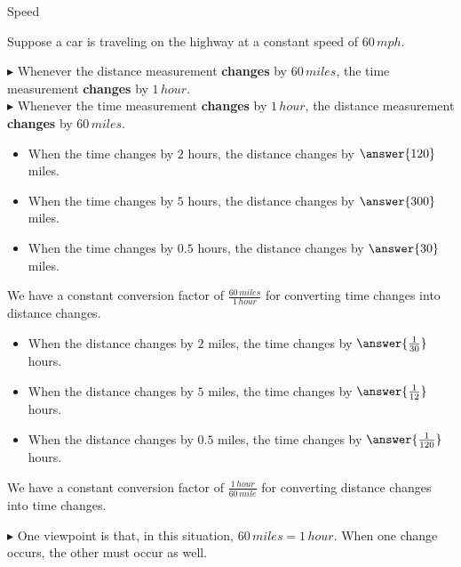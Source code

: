 \documentclass{ximera}
\begin{document}
\begin{example} Speed


Suppose a car is traveling on the highway at a constant speed of $60 \, mph$.


$\blacktriangleright$ Whenever the distance measurement \textbf{\textcolor{purple!85!blue}{changes}} by $60 \, miles$, the time measurement \textbf{\textcolor{purple!85!blue}{changes}} by $1 \, hour$. \\
$\blacktriangleright$ Whenever the time measurement \textbf{\textcolor{purple!85!blue}{changes}} by $1 \, hour$, the distance measurement \textbf{\textcolor{purple!85!blue}{changes}} by $60 \, miles$. 




\begin{itemize}
\item When the time changes by $2$ hours, the distance changes by $\answer{120}$ miles. 
\item When the time changes by $5$ hours, the distance changes by $\answer{300}$ miles. 
\item When the time changes by $0.5$ hours, the distance changes by $\answer{30}$ miles. 
\end{itemize}



We have a constant conversion factor of $\frac{60 \, miles}{1 \, hour}$ for converting time changes into distance changes. 






\begin{itemize}
\item When the distance changes by $2$ miles, the time changes by $\answer{\frac{1}{30}}$ hours. 
\item When the distance changes by $5$ miles, the time changes by $\answer{\frac{1}{12}}$ hours. 
\item When the distance changes by $0.5$ miles, the time changes by $\answer{\frac{1}{120}}$ hours. 
\end{itemize}



We have a constant conversion factor of $\frac{1 \, hour}{60 \, mile}$ for converting distance changes into time changes. 




$\blacktriangleright$ One viewpoint is that, in this situation, $60 \, miles = 1 \, hour$.  When one change occurs, the other must occur as well.





\end{example} 
\end{document}
